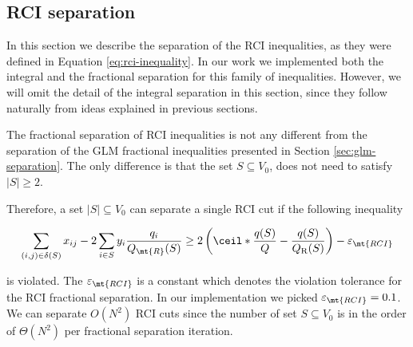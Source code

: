 \subsection{RCI separation}\label{sec:rci-separation}
In this section we describe the separation of the RCI inequalities, as they were defined in Equation \eqref{eq:rci-inequality}.
In our work we implemented both the integral and the fractional separation for this family of inequalities.
However, we will omit the detail of the integral separation in this section, since they follow naturally from ideas explained in previous sections.

The fractional separation of RCI inequalities is not any different from the separation of the GLM fractional inequalities presented in Section \ref{sec:glm-separation}.
The only difference is that the set $S \subseteq V_0$, does not need to satisfy $|S| \ge 2$.

Therefore, a set $|S| \subseteq V_0$ can separate a single RCI cut if the following inequality

\begin{equation}
	\begin{split}
		\sum_{(i, j) \in \delta(S)} x_{ij} -2 \sum_{i \in S} y_i {\frac{q_i}{Q_\mt{R}(S)}}    \ge   2 \left( \ceil*{ \frac{q(S)}{Q}} - \frac{q(S)}{Q_{\mathrm{R}}(S)} \right) - \varepsilon_{\mt{RCI}}
	\end{split}
\end{equation}

is violated.
The $\varepsilon_{\mt{RCI}}$ is a constant which denotes the violation tolerance for the RCI fractional separation.
In our implementation we picked $\varepsilon_{\mt{RCI}} = 0.1$.
We can separate $O(N^2)$ RCI cuts since the number of set $S \subseteq V_0$ is in the order of $\Theta(N^2)$ per fractional separation iteration.
